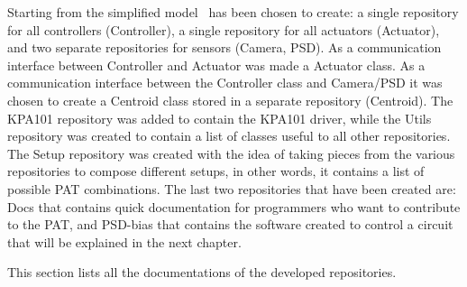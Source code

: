 Starting from the simplified model~ has been chosen to create: a single repository for all controllers (Controller), a single repository for all actuators (Actuator), and two separate repositories for sensors (Camera, PSD).
As a communication interface between Controller and Actuator was made a Actuator class. As a communication interface between the Controller class and Camera/PSD it was chosen to create a Centroid class stored in a separate repository (Centroid).
The KPA101 repository was added to contain the KPA101 driver, while the Utils repository was created to contain a list of classes useful to all other repositories.
The Setup repository was created with the idea of taking pieces from the various repositories to compose different setups, in other words, it contains a list of possible PAT combinations.
The last two repositories that have been created are: Docs that contains quick documentation for programmers who want to contribute to the PAT, and PSD-bias that contains the software created to control a circuit that will be explained in the next chapter.

This section lists all the documentations of the developed repositories.

      {\parindent0pt
            
            
            
            
            
            
            
            
      }